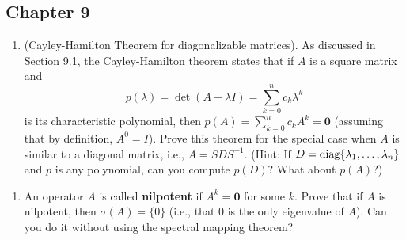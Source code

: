 \documentclass[../psets.tex]{subfiles}
\begin{document}
\subsection*{Chapter 9}
\begin{enumerate}[label={\textbf{1.\arabic*.}}]
    \item (Cayley-Hamilton Theorem for diagonalizable matrices). As discussed in Section 9.1, the Cayley-Hamilton theorem states that if $A$ is a square matrix and
    \begin{equation*}
        p(\lambda) = \det(A-\lambda I) = \sum_{k=0}^nc_k\lambda^k
    \end{equation*}
    is its characteristic polynomial, then $p(A)=\sum_{k=0}^nc_kA^k=\bm{0}$ (assuming that by definition, $A^0=I$). Prove this theorem for the special case when $A$ is similar to a diagonal matrix, i.e., $A=SDS^{-1}$. (Hint: If $D=\operatorname{diag}\{\lambda_1,\dots,\lambda_n\}$ and $p$ is any polynomial, can you compute $p(D)$? What about $p(A)$?)
\end{enumerate}

\begin{enumerate}[label={\textbf{2.\arabic*.}}]
    \item An operator $A$ is called \textbf{nilpotent} if $A^k=\bm{0}$ for some $k$. Prove that if $A$ is nilpotent, then $\sigma(A)=\{0\}$ (i.e., that 0 is the only eigenvalue of $A$). Can you do it without using the spectral mapping theorem?
\end{enumerate}
\end{document}
